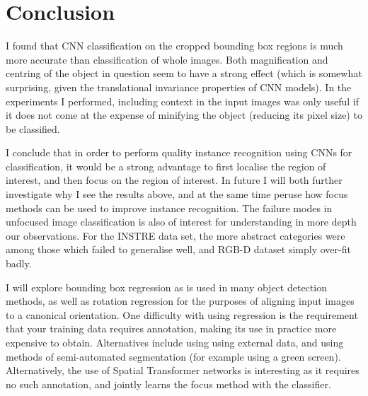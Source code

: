\section{Conclusion}

I found that CNN classification on the cropped bounding box regions is much more accurate than classification of whole images. Both magnification and centring of the object in question seem to have a strong effect (which is somewhat surprising, given the translational invariance properties of CNN models). In the experiments I performed, including context in the input images was only useful if it does not come at the expense of minifying the object (reducing its pixel size) to be classified.

I conclude that in order to perform quality instance recognition using \gls{CNN}s for classification, it would be a strong advantage to first localise the region of interest, and then focus on the region of interest.  In future I will both further investigate why I see the results above, and at the same time peruse how focus methods can be used to improve instance recognition. The failure modes in unfocused image classification is also of interest for understanding in more depth our observations. For the INSTRE data set, the more abstract categories were among those which failed to generalise well, and RGB-D dataset simply over-fit badly.

I will explore bounding box regression as is used in many object detection methods, as well as rotation regression for the purposes of aligning input images to a canonical orientation. One difficulty with using regression is the requirement that your training data requires annotation, making its use in practice more expensive to obtain. Alternatives include using using external data, and using methods of semi-automated segmentation (for example using a green screen). Alternatively, the use of Spatial Transformer networks is interesting as it requires no such annotation, and jointly learns the focus method with the classifier.




